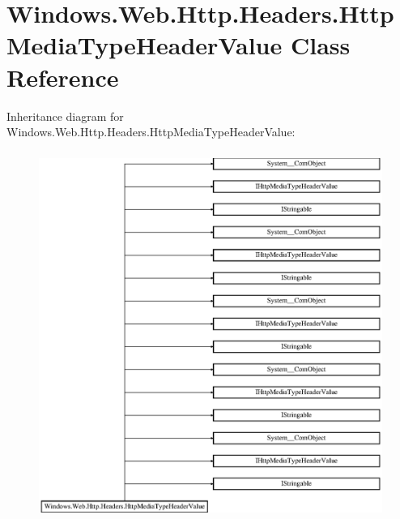\hypertarget{class_windows_1_1_web_1_1_http_1_1_headers_1_1_http_media_type_header_value}{}\section{Windows.\+Web.\+Http.\+Headers.\+Http\+Media\+Type\+Header\+Value Class Reference}
\label{class_windows_1_1_web_1_1_http_1_1_headers_1_1_http_media_type_header_value}
Inheritance diagram for Windows.\+Web.\+Http.\+Headers.\+Http\+Media\+Type\+Header\+Value\+:\begin{figure}[H]
\begin{center}
\leavevmode
\includegraphics[height=12.000000cm]{class_windows_1_1_web_1_1_http_1_1_headers_1_1_http_media_type_header_value}
\end{center}
\end{figure}
